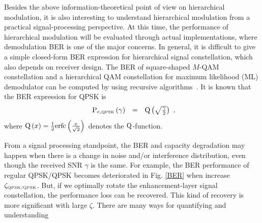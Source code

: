 \documentclass[10pt,fleqn, twocolumn]{IEEEtran}
\begin{document}
Besides the above information-theoretical point of view on
hierarchical modulation, it is also interesting to understand
hierarchical modulation from a practical signal-processing
perspective. At this time, the performance of hierarchical
modulation will be evaluated through actual implementations, where
demodulation BER is one of the major concerns. In general, it is
difficult to give a simple closed-form BER expression for
hierarchical signal constellation, which also depends on receiver
design. The BER of square-shaped $M$-QAM constellation and a
hierarchical QAM constellation for maximum likelihood (ML)
demodulator can be computed by using recursive
algorithms~\cite{Vitt03}. It is known that the BER expression for
QPSK is
\begin{equation}
\begin{array}{rcl}
{\rm P}_{e,\mbox{\tiny QPSK}}\left(\gamma\right)&=&{\rm
Q}\left(\sqrt{\frac{\gamma}{2}}\right)
\end{array},\label{BER_QPSK}
\end{equation}
\noindent where ${\rm Q}\left(x\right)=\frac{1}{2}{\rm
erfc}\left(\frac{x}{\sqrt{2}}\right)$ denotes the $\rm
Q$-function.
\begin{figure} 
\end{figure}
From a signal processing standpoint, the BER and capacity
degradation may happen when there is a change in noise and/or
interference distribution, even though the received SNR $\gamma$
is the same. For example, the BER performance of regular QPSK/QPSK
becomes deteriorated in Fig. \ref{BER} when increase
$\zeta_{\mbox{\tiny QPSK/QPSK}}$. But, if we optimally rotate the
enhancement-layer signal constellation, the performance loss can
be recovered. This kind of recovery is more significant with large
$\zeta$. There are many ways for quantifying and understanding
\end{document}

